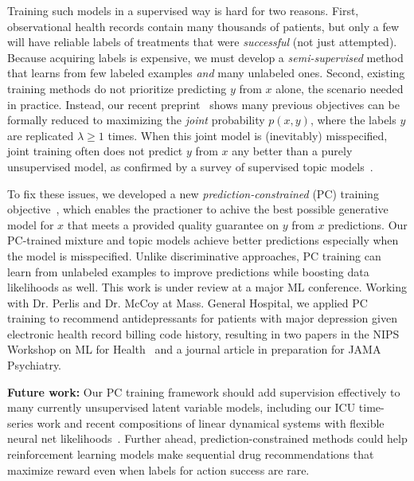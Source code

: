 \documentclass[11pt,letterpaper]{article}
\begin{document}
Training such models in a supervised way is hard for two reasons. First, observational health records contain many thousands of patients, but only a few will have reliable labels of treatments that were \emph{successful} (not just attempted).
Because acquiring labels is expensive, we must develop a \emph{semi-supervised} method that learns from few labeled examples \emph{and} many unlabeled ones.
Second, existing training methods do not prioritize predicting $y$ from $x$ alone, the scenario needed in practice.
Instead, our recent preprint~\cite{hughes2017pc} shows many previous objectives \citep{blei2008sLDA,zhang2014howToSuperviseTopicModels,zhu2012medlda,ganchev2010posteriorconstraints} can be formally reduced to maximizing the \emph{joint} probability $p(x,y)$, where the labels $y$ are replicated $\lambda \geq 1$ times. When this joint model is (inevitably) misspecified, 
joint training often does not predict $y$ from $x$ any better than a purely unsupervised model, as confirmed by a survey of supervised topic models~\citep{halpern2012comparison}.

To fix these issues, we developed a new \emph{prediction-constrained} (PC) training objective~\cite{hughes2017pc}, which enables the practioner to achive the best possible generative model for $x$ that meets a provided quality guarantee on $y$ from $x$ predictions.
Our PC-trained mixture and topic models achieve better predictions especially when the model is misspecified. Unlike discriminative approaches, PC training can learn from unlabeled examples to improve predictions while boosting data likelihoods as well.
This work is under review at a major ML conference. 
Working with Dr. Perlis and Dr. McCoy at Mass. General Hospital, we applied PC training to recommend antidepressants for patients with major depression given electronic health record billing code history, resulting in two papers in the NIPS Workshop on ML for Health~\citep{hughes2017clinicalPCsLDA, hughes2016clinicalSLDA} and a journal article in preparation for JAMA Psychiatry.


\textbf{Future work:} Our PC training framework should add supervision effectively to many currently unsupervised latent variable models, including our ICU time-series work and recent compositions of linear dynamical systems with flexible neural net likelihoods~\citep{johnson2016svae}. 
Further ahead, prediction-constrained methods could help reinforcement learning models make sequential drug recommendations that maximize reward even when labels for action success are rare.
\end{document}
